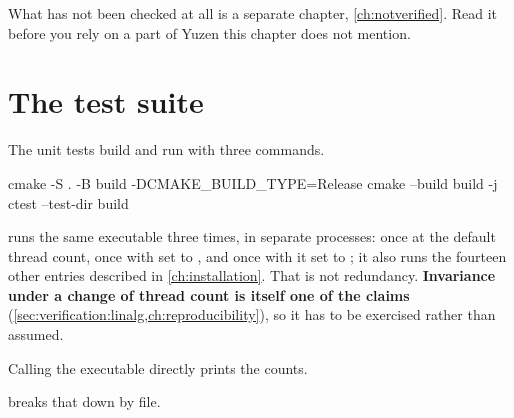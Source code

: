 What has not been checked at all is a separate chapter,
\cref{ch:notverified}. Read it before you rely on a part of Yuzen this chapter
does not mention.

\section{The test suite}
\label{sec:verification:suite}

The unit tests build and run with three commands.

\begin{shell}
cmake -S . -B build -DCMAKE_BUILD_TYPE=Release
cmake --build build -j
ctest --test-dir build
\end{shell}

 runs the same executable three times, in separate processes: once
at the default thread count, once with  set to ,
and once with it set to ; it also runs the fourteen other
entries described in \cref{ch:installation}. That is not redundancy. \textbf{Invariance
under a change of thread count is itself one of the claims}
(\cref{sec:verification:linalg,ch:reproducibility}), so it has to be exercised
rather than assumed.

Calling the executable directly prints the counts.


 breaks that down by file.

